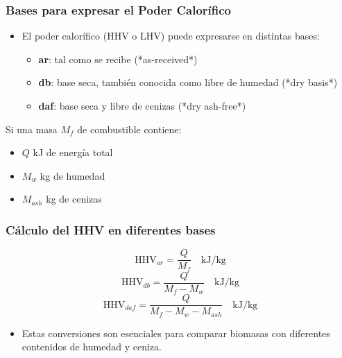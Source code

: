 \documentclass[../../main.tex]{subfiles}
\begin{document}
\begin{frame}
\frametitle{Bases para expresar el Poder Calorífico}

\begin{itemize}
    \item El poder calorífico (HHV o LHV) puede expresarse en distintas bases:
    \begin{itemize}
        \item \textbf{ar}: tal como se recibe (*as-received*)
        \item \textbf{db}: base seca, también conocida como libre de humedad (*dry basis*)
        \item \textbf{daf}: base seca y libre de cenizas (*dry ash-free*)
    \end{itemize}
\end{itemize}

\vspace{0.5cm}

Si una masa \( M_f \) de combustible contiene:
\begin{itemize}
    \item \( Q \) kJ de energía total
    \item \( M_w \) kg de humedad
    \item \( M_{ash} \) kg de cenizas
\end{itemize}

\end{frame}

\begin{frame}
\frametitle{Cálculo del HHV en diferentes bases}

\[
\text{HHV}_{ar} = \frac{Q}{M_f} \quad \text{kJ/kg}
\]
\[
\text{HHV}_{db} = \frac{Q}{M_f - M_w} \quad \text{kJ/kg}
\]
\[
\text{HHV}_{daf} = \frac{Q}{M_f - M_w - M_{ash}} \quad \text{kJ/kg}
\]

\bigskip

\begin{itemize}
    \item Estas conversiones son esenciales para comparar biomasas con diferentes contenidos de humedad y ceniza.
\end{itemize}

\end{frame}
\end{document}
